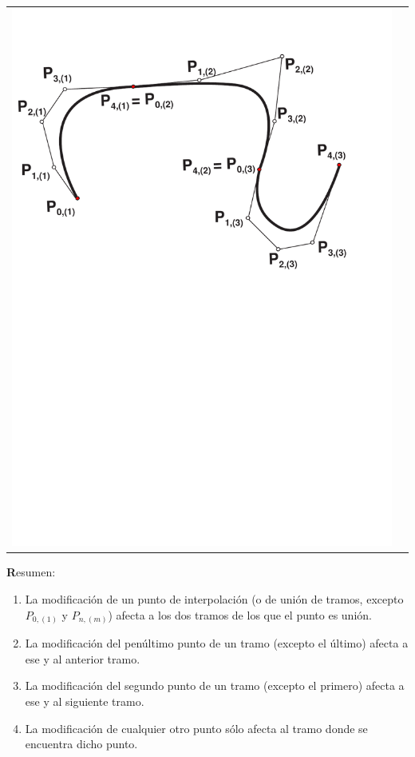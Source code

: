 \documentclass[ebook,oneside]{memoir}
\begin{document}
\begin{center}
\begin{tabular}{cc}
\includegraphics[scale=0.45]{3_24b.pdf}
\end{tabular}
\end{center}

{\textbf Resumen:}

\begin{enumerate}
\item La modificaci\'{o}n de un punto de interpolaci\'{o}n (o de uni\'{o}n de tramos, excepto $P_{0,(1)}$  y $P_{n, (m)}$) afecta a los dos tramos de los que el punto es uni\'{o}n.
\item La modificaci\'{o}n del pen\'{u}ltimo punto de un tramo (excepto el \'{u}ltimo) afecta a ese y al anterior tramo.
\item La modificaci\'{o}n del segundo punto de un tramo (excepto el primero) afecta a ese y al siguiente tramo.
\item La modificaci\'{o}n de cualquier otro punto s\'{o}lo afecta al tramo donde se encuentra dicho punto.
\end{enumerate}
\end{document}
